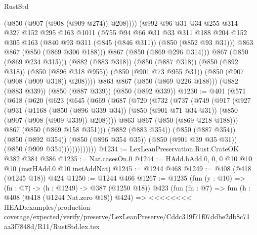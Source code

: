 \begin{lexlean}{RustStd}
\begin{coremodule}
{\begin{coremodule}
{{{{{                (@850 (@907 (@908 (@909 @274)) @208))))
            (@992
              @96
              @31
              @34
              @255
              @314
              @327
              @152
              @295
              @163
              @1011
              (@755
                @94
                @66
                @31
                @33
                @311
                @188
                @204
                @152
                @305
                @163
                (@840 @93 @311 (@845 (@846 @311)) (@850 (@852 @93 @31)))
                @863
                @867
                (@850 (@869 @306 @188)))
              @867
              (@850 (@869 @296 @314)))
            @867
            (@850 (@869 @234 @315)))
          (@882 (@883 @318))
          (@850 (@887 @318))
          (@850 (@892 @318))
          (@850 (@896 @318 @955))
          (@850 (@901 @73 @955 @31))
          (@850 (@907 (@908 (@909 @318)) @208))))
      @863
      @867
      (@850 (@869 @226 @188)))
    (@882 (@883 @339))
    (@850 (@887 @339))
    (@850 (@892 @339))
@1230 := @401
    (@571
      (@618
        (@620
          (@623
            (@645
              (@669
                (@687
                  (@720
                    (@732
                      (@737
                        (@749
                          (@917
                            (@927
                              (@931
                                (@1168
                                  (@850 (@896 @339 @34))
                                  (@850 (@901 @71 @34 @31))
                                  (@850 (@907 (@908 (@909 @339)) @208))))
                              @863
                              @867
                              (@850 (@869 @218 @188)))
                            @867
                            (@850 (@869 @158 @351)))
                          (@882 (@883 @354))
                          (@850 (@887 @354))
                          (@850 (@892 @354))
                          (@850 (@896 @354 @35))
                          (@850 (@901 @39 @35 @31))
                          (@850 (@909 @354)))))))))))))
@1234 := LexLeanPreservation.Rust.CrateOK @382 @384 @386
@1235 := Nat.casesOn.{0}
@1244 := HAdd.hAdd.{0, 0, 0} @10 @10 @10 (instHAdd.{0} @10 instAddNat)
@1245 := @1244 @468
@1249 := @408 (@418 (@1245 @18)) @424
@1250 := @1244 @466
@1267 := @1235
    (fun (y : @10) => (fn : @7) -> (h : @1249) -> @387 (@1250 @18))
    @423
    (fun (fn : @7) =>
    fun (h : @408 (@418 (@1244 Nat.zero @18)) @424) =>
<<<<<<<< HEAD:examples/production-coverage/expected/verify/preserve/LexLeanPreserve/Cddc319f71f07ddbe2db8c71aa3f7848d/R11/RustStd.lex.tex
}}}}}
\end{coremodule}}
\end{coremodule}
\end{lexlean}

